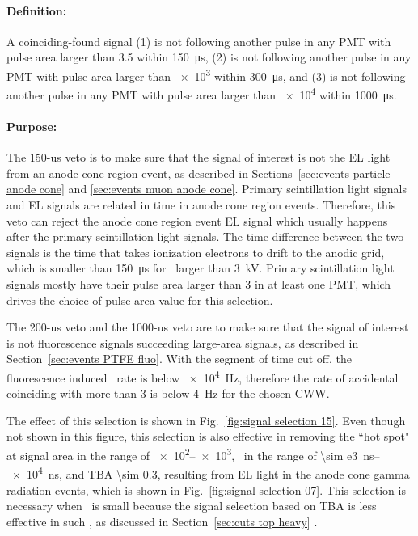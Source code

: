 \paragraph{Definition:}
A coinciding-found signal (1) is not following another pulse in any PMT with pulse area larger than \SI{3.5}{\phe} within \SI{150}{\us}, (2) is not following another pulse in any PMT with pulse area larger than \SI{e3}{\phe} within \SI{300}{\us}, and (3) is not following another pulse in any PMT with pulse area larger than \SI{e4}{\phe} within \SI{1000}{\us}.
\paragraph{Purpose:}
The 150-us veto is to make sure that the signal of interest is not the EL light from an anode cone region event, as described in Sections~\ref{sec:events particle anode cone} and \ref{sec:events muon anode cone}. Primary scintillation light signals and EL signals are related in time in anode cone region events.  Therefore, this veto can reject the anode cone region event EL signal which usually happens after the primary scintillation light signals. The time difference between the two signals is the time that takes ionization electrons to drift to the anodic grid, which is smaller than \SI{150}{\us} for \opva\ larger than \SI{3}{\kV}. Primary scintillation light signals mostly have their pulse area larger than \SI{3}{\phe} in at least one PMT, which drives the choice of pulse area value for this selection.

The 200-us veto and the 1000-us veto are to make sure that the signal of interest is not fluorescence signals succeeding large-area signals, as described in Section~\ref{sec:events PTFE fluo}. With the segment of time cut off, the fluorescence induced \sphe\ rate is below \SI{e4}{\Hz}, therefore the rate of accidental coinciding with more than \SI{3}{\phe} is below \SI{4}{\Hz} for the chosen CWW. 

The effect of this selection is shown in Fig.~\ref{fig:signal selection 15}. Even though not shown in this figure, this selection is also effective in removing the ``hot spot" at signal area in the range of \SIrange{e2}{e3}{\phe}, \rpd\ in the range of \SIrange{\sim e3}{e4}{\ns}, and TBA \num{\sim 0.3}, resulting from EL light in the anode cone gamma radiation events, which is shown in Fig.~\ref{fig:signal selection 07}. This selection is necessary when \opdv\ is small because the signal selection based on TBA is less effective in such \opdv , as discussed in Section~\ref{sec:cuts top heavy} . 

